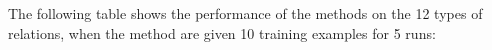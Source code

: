 \documentclass[paper=a4,fontsize=11pt]{scrartcl}
\numberwithin{equation}{section}    %
\numberwithin{figure}{section}      %
\numberwithin{table}{section}       %
\begin{document}
The following table shows the performance of the methods on the 12 types of relations,
when the method are given 10 training examples for 5 runs:

\end{document}
